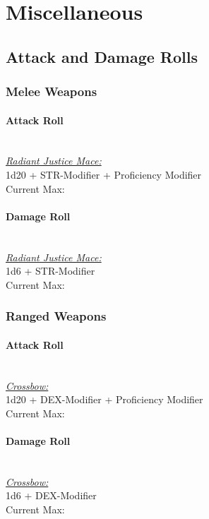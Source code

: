 \documentclass[letterpaper,openany,oneside,twocolumn]{book}
\begin{document}
\section*{Miscellaneous}
\subsection*{Attack and Damage Rolls}
\subsubsection*{Melee Weapons}
\paragraph*{Attack Roll}\hfill\\
\underline{\textit{Radiant Justice Mace:}}\\
1d20 + STR-Modifier + Proficiency Modifier\\
\indent Current Max: 
\paragraph*{Damage Roll}\hfill\\
\underline{\textit{Radiant Justice Mace:}}\\
1d6 + STR-Modifier\\
\indent Current Max: 
\subsubsection*{Ranged Weapons}
\paragraph*{Attack Roll}\hfill\\
\underline{\textit{Crossbow:}}\\
1d20 + DEX-Modifier + Proficiency Modifier\\
\indent Current Max: 
\paragraph*{Damage Roll}\hfill\\
\underline{\textit{Crossbow:}}\\
1d6 + DEX-Modifier\\
\indent Current Max: 
\end{document}

